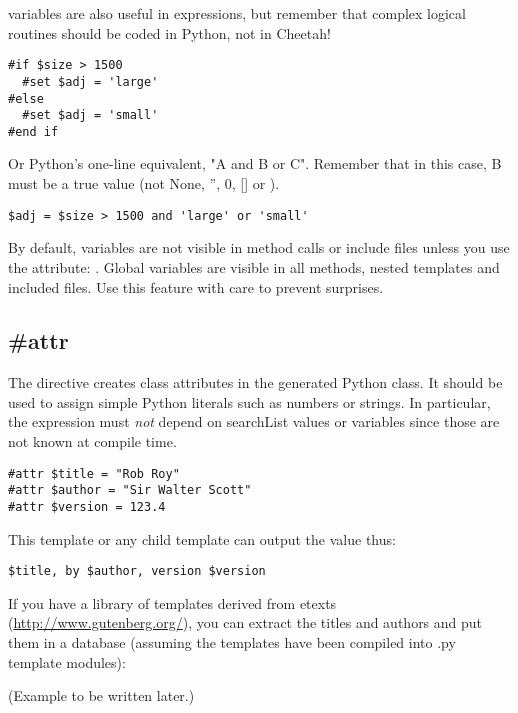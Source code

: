  variables are also useful in  expressions, but
remember that complex logical routines should be coded in Python, not in
Cheetah!
\begin{verbatim}
#if $size > 1500
  #set $adj = 'large'
#else
  #set $adj = 'small'
#end if
\end{verbatim}
Or Python's one-line equivalent, "A and B or C".  Remember that in this case,
B must be a true value (not None, '', 0, [] or {}).  
\begin{verbatim}
$adj = $size > 1500 and 'large' or 'small'
\end{verbatim}

By default,  variables are not visible in method calls or include
files unless you use the  attribute: .  Global variables are visible in all methods, nested templates and
included files.  Use this feature with care to prevent surprises.


\subsection{\#attr}
\label{inheritanceEtc.attr}

The  directive creates class attributes in the generated Python
class.  It should be used to assign simple Python literals such as numbers or
strings.  In particular, the expression must {\em not} depend on searchList
values or  variables since those are not known at compile time.

\begin{verbatim}
#attr $title = "Rob Roy"
#attr $author = "Sir Walter Scott"
#attr $version = 123.4
\end{verbatim}

This template or any child template can output the value thus:
\begin{verbatim}
$title, by $author, version $version
\end{verbatim}

If you have a library of templates derived from etexts
(\url{http://www.gutenberg.org/}), you can extract the titles and authors
and put them in a database (assuming the templates have been compiled into
.py template modules):

(Example to be written later.)
%
%

